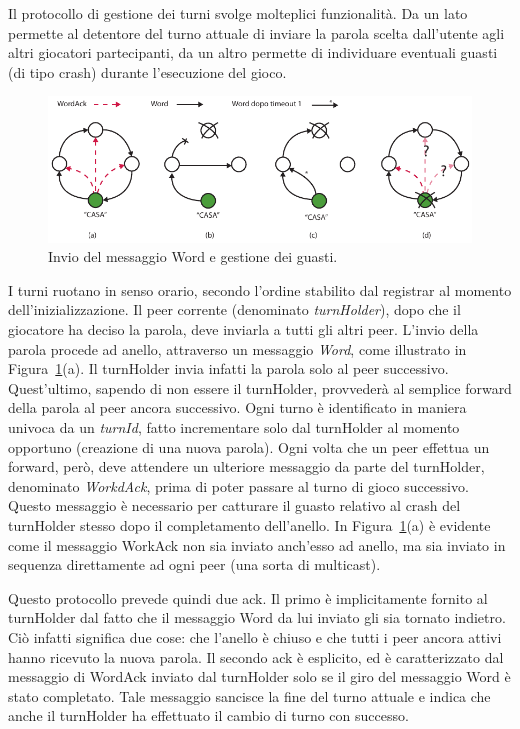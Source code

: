 \documentclass[10.5pt]{article}
\begin{document}
Il protocollo di gestione dei turni svolge molteplici funzionalità. Da un lato permette al detentore del turno attuale di inviare la parola scelta dall'utente agli altri giocatori partecipanti, da un altro permette di individuare eventuali guasti (di tipo crash) durante l'esecuzione del gioco.

\begin{figure}
\centering
\includegraphics[scale=0.9]{imgs/Esempi.pdf}
\caption{Invio del messaggio Word e gestione dei guasti.}
\label{img:word}
\end{figure}

I turni ruotano in senso orario, secondo l'ordine stabilito dal registrar al momento dell'inizializzazione. Il peer corrente (denominato \emph{turnHolder}), dopo che il giocatore ha deciso la parola, deve inviarla a tutti gli altri peer. L'invio della parola procede ad anello, attraverso un messaggio \emph{Word}, come illustrato in Figura~\ref{img:word}(a). Il turnHolder invia infatti la parola solo al peer successivo. Quest'ultimo, sapendo di non essere il turnHolder, provvederà al semplice forward della parola al peer ancora successivo. Ogni turno è identificato in maniera univoca da un \emph{turnId}, fatto incrementare solo dal turnHolder al momento opportuno (creazione di una nuova parola). Ogni volta che un peer effettua un forward, però, deve attendere un ulteriore messaggio da parte del turnHolder, denominato \emph{WorkdAck}, prima di poter passare al turno di gioco successivo. Questo messaggio è necessario per catturare il guasto relativo al crash del turnHolder stesso dopo il completamento dell'anello. In Figura~\ref{img:word}(a) è evidente come il messaggio WorkAck non sia inviato anch'esso ad anello, ma sia inviato in sequenza direttamente ad ogni peer (una sorta di multicast).

Questo protocollo prevede quindi due ack. Il primo è implicitamente fornito al turnHolder dal fatto che il messaggio Word da lui inviato gli sia tornato indietro. Ciò infatti significa due cose: che l'anello è chiuso e che tutti i peer ancora attivi hanno ricevuto la nuova parola. Il secondo ack è esplicito, ed è caratterizzato dal messaggio di WordAck inviato dal turnHolder solo se il giro del messaggio Word è stato completato. Tale messaggio sancisce la fine del turno attuale e indica che anche il turnHolder ha effettuato il cambio di turno con successo.
\end{document}
